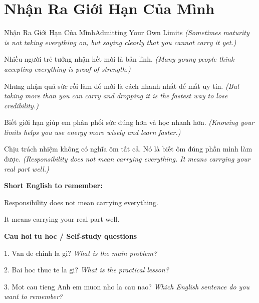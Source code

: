 \section{Nhận Ra Giới Hạn Của Mình}
\begin{truyen}{Nhận Ra Giới Hạn Của Mình}{Admitting Your Own Limits}
\textit{(Sometimes maturity is not taking everything on, but saying clearly that you cannot carry it yet.)}

Nhiều người trẻ tưởng nhận hết mới là bản lĩnh.
\textit{(Many young people think accepting everything is proof of strength.)}

Nhưng nhận quá sức rồi làm đổ mới là cách nhanh nhất để mất uy tín.
\textit{(But taking more than you can carry and dropping it is the fastest way to lose credibility.)}

Biết giới hạn giúp em phân phối sức đúng hơn và học nhanh hơn.
\textit{(Knowing your limits helps you use energy more wisely and learn faster.)}

\end{truyen}

\begin{baihoc}
Chịu trách nhiệm không có nghĩa ôm tất cả. Nó là biết ôm đúng phần mình làm được.
\textit{(Responsibility does not mean carrying everything. It means carrying your real part well.)}
\end{baihoc}

\begin{ghinhoanh}
\textbf{Short English to remember:}

Responsibility does not mean carrying everything.

It means carrying your real part well.

\end{ghinhoanh}

\begin{tuhocnhanh}
\textbf{Cau hoi tu hoc / Self-study questions}

1. Van de chinh la gi? \textit{What is the main problem?}

2. Bai hoc thuc te la gi? \textit{What is the practical lesson?}

3. Mot cau tieng Anh em muon nho la cau nao? \textit{Which English sentence do you want to remember?}
\end{tuhocnhanh}
\ngancach

